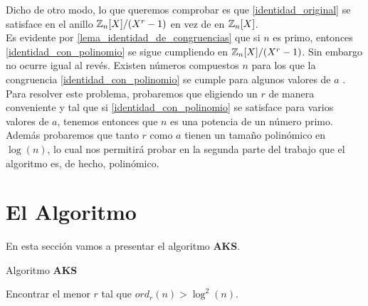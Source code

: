 Dicho de otro modo, lo que queremos comprobar es que \eqref{identidad_original} se satisface en el anillo $\mathbb{Z}_n[X]/(X^r-1)$ en vez de en $\mathbb{Z}_n[X]$.\\

Es evidente por \autoref{lema_identidad_de_congruencias} que si $n$ es primo, entonces \eqref{identidad_con_polinomio} se sigue cumpliendo en $\mathbb{Z}_n[X]/(X^r-1)$. Sin embargo no ocurre igual al revés. Existen números compuestos $n$ para los que la congruencia \eqref{identidad_con_polinomio} se cumple para algunos valores de $a$ \cite{primes_is_in_p}.\\

Para resolver este problema, probaremos que eligiendo un $r$ de manera conveniente y tal que si \eqref{identidad_con_polinomio} se satisface para varios valores de $a$, tenemos entonces que $n$ es una potencia de un número primo.\\

Además probaremos que tanto $r$ como $a$ tienen un tamaño polinómico en $\log(n)$, lo cual nos permitirá probar en la segunda parte del trabajo que el algoritmo es, de hecho, polinómico.

\section{El Algoritmo}

En esta sección vamos a presentar el algoritmo \textbf{AKS}.

\begin{algorithm}[H]
	\caption{Algoritmo \textbf{AKS}}\label{aks_algorithm}
	\begin{algorithmic}[1]
				\State {}
			\EndIf
			\State
			\State Encontrar el menor $r$ tal que $ord_r(n) > \log^2(n)$.
			\State
				\State {}
			\EndIf
			\State
				\State {}
			\EndIf
			\State
					\State {}
				\EndIf
			\EndFor
			\State
			\State {}
		\EndProcedure
	\end{algorithmic}
\end{algorithm}

